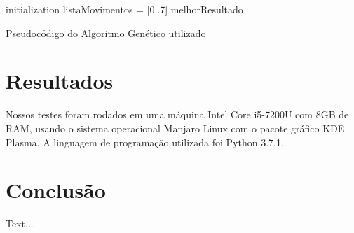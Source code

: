 \documentclass[sigconf]{acmart}
\begin{document}
 \begin{algorithm}
  initialization\;
  listaMovimentos = [0..7]\;
  melhorResultado\;
  \caption{Pseudocódigo do Algoritmo Genético utilizado}
 \end{algorithm}
 

\section{Resultados}

Nossos testes foram rodados em uma máquina Intel Core i5-7200U com 8GB de RAM, usando o sistema operacional Manjaro Linux com o pacote gráfico KDE Plasma. A linguagem de programação utilizada foi Python 3.7.1.

\section{Conclusão}

Text...



\end{document}
